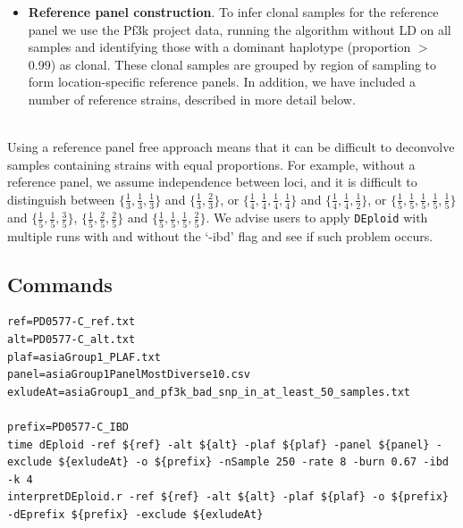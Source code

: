 \documentclass[9pt]{article}
\begin{document}
\begin{itemize}
\begin{itemize}
\item {\bf Reference panel construction}. To infer clonal samples for the reference panel we use the Pf3k project data, running the algorithm without LD on all samples and identifying those with a dominant haplotype (proportion $>$ 0.99) as clonal.  These clonal samples are grouped by region of sampling to form location-specific reference panels.  In addition, we have included a number of reference strains, described in more detail below.

\end{itemize}



\end{itemize}



\\
Using a reference panel free approach means that it can be difficult to deconvolve samples containing strains with equal proportions. For example, without a reference panel, we assume independence between loci, and it is difficult to distinguish between $\{\frac{1}{3},\frac{1}{3},\frac{1}{3}\}$ and $\{\frac{1}{3},\frac{2}{3}\}$, or
$\{\frac{1}{4},\frac{1}{4}, \frac{1}{4}, \frac{1}{4}\}$ and $\{\frac{1}{4},\frac{1}{4}, \frac{1}{2}\}$, or $\{\frac{1}{5},\frac{1}{5}, \frac{1}{5}, \frac{1}{5}, \frac{1}{5}\}$ and $\{\frac{1}{5},\frac{1}{5}, \frac{3}{5}\}$, $\{\frac{1}{5},\frac{2}{5}, \frac{2}{5}\}$ and
$\{\frac{1}{5},\frac{1}{5}, \frac{1}{5}, \frac{2}{5}\}$. We advise users to apply {\tt DEploid} with multiple runs with and without the `-ibd' flag and see if such problem occurs.


\subsection{Commands}

\linespread{1}
\begin{lstlisting}
ref=PD0577-C_ref.txt
alt=PD0577-C_alt.txt
plaf=asiaGroup1_PLAF.txt
panel=asiaGroup1PanelMostDiverse10.csv
exludeAt=asiaGroup1_and_pf3k_bad_snp_in_at_least_50_samples.txt

prefix=PD0577-C_IBD
time dEploid -ref ${ref} -alt ${alt} -plaf ${plaf} -panel ${panel} -exclude ${exludeAt} -o ${prefix} -nSample 250 -rate 8 -burn 0.67 -ibd -k 4
interpretDEploid.r -ref ${ref} -alt ${alt} -plaf ${plaf} -o ${prefix} -dEprefix ${prefix} -exclude ${exludeAt}
\end{lstlisting}
\end{document}
